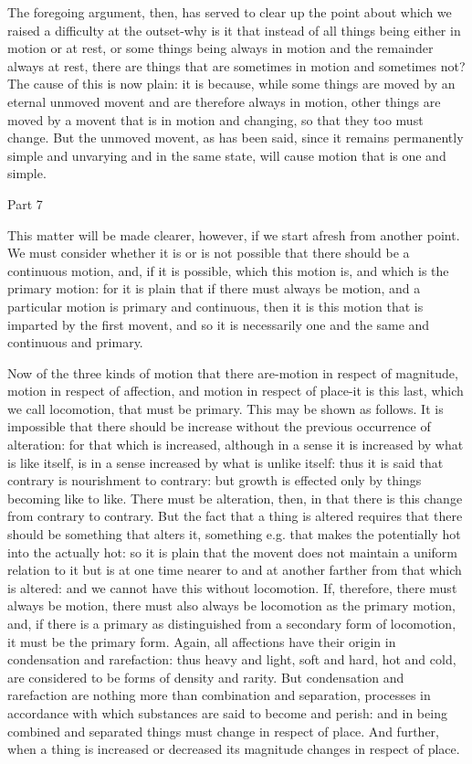 The foregoing argument, then, has served to clear up the point about
which we raised a difficulty at the outset-why is it that instead
of all things being either in motion or at rest, or some things being
always in motion and the remainder always at rest, there are things
that are sometimes in motion and sometimes not? The cause of this
is now plain: it is because, while some things are moved by an eternal
unmoved movent and are therefore always in motion, other things are
moved by a movent that is in motion and changing, so that they too
must change. But the unmoved movent, as has been said, since it remains
permanently simple and unvarying and in the same state, will cause
motion that is one and simple. 

Part 7

This matter will be made clearer, however, if we start afresh from
another point. We must consider whether it is or is not possible that
there should be a continuous motion, and, if it is possible, which
this motion is, and which is the primary motion: for it is plain that
if there must always be motion, and a particular motion is primary
and continuous, then it is this motion that is imparted by the first
movent, and so it is necessarily one and the same and continuous and
primary. 

Now of the three kinds of motion that there are-motion in respect
of magnitude, motion in respect of affection, and motion in respect
of place-it is this last, which we call locomotion, that must be primary.
This may be shown as follows. It is impossible that there should be
increase without the previous occurrence of alteration: for that which
is increased, although in a sense it is increased by what is like
itself, is in a sense increased by what is unlike itself: thus it
is said that contrary is nourishment to contrary: but growth is effected
only by things becoming like to like. There must be alteration, then,
in that there is this change from contrary to contrary. But the fact
that a thing is altered requires that there should be something that
alters it, something e.g. that makes the potentially hot into the
actually hot: so it is plain that the movent does not maintain a uniform
relation to it but is at one time nearer to and at another farther
from that which is altered: and we cannot have this without locomotion.
If, therefore, there must always be motion, there must also always
be locomotion as the primary motion, and, if there is a primary as
distinguished from a secondary form of locomotion, it must be the
primary form. Again, all affections have their origin in condensation
and rarefaction: thus heavy and light, soft and hard, hot and cold,
are considered to be forms of density and rarity. But condensation
and rarefaction are nothing more than combination and separation,
processes in accordance with which substances are said to become and
perish: and in being combined and separated things must change in
respect of place. And further, when a thing is increased or decreased
its magnitude changes in respect of place. 

